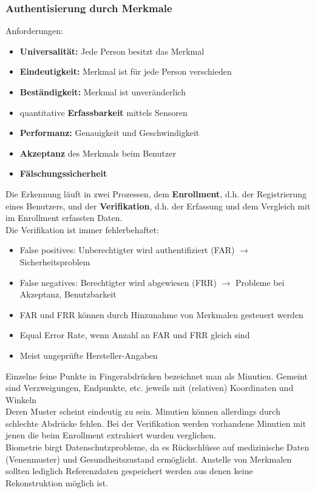 \documentclass[a4paper,12pt,leqno]{article}
\begin{document}
\subsubsection{Authentisierung durch Merkmale}

Anforderungen:
\begin{itemize}
\item \textbf{Universalität:} Jede Person besitzt das Merkmal
\item \textbf{Eindeutigkeit:} Merkmal ist für jede Person verschieden
\item \textbf{Beständigkeit:} Merkmal ist unveränderlich
\item quantitative \textbf{Erfassbarkeit} mittels Sensoren
\item \textbf{Performanz:} Genauigkeit und Geschwindigkeit
\item \textbf{Akzeptanz} des Merkmals beim Benutzer
\item \textbf{Fälschungssicherheit}
\end{itemize}

Die Erkennung läuft in zwei Prozessen, dem \textbf{Enrollment}, d.h. der Registrierung eines Benutzers, und der \textbf{Verifikation}, d.h. der Erfassung und dem Vergleich mit im Enrollment erfassten Daten.\\

Die Verifikation ist immer fehlerbehaftet:
\begin{itemize}
\item False positives: Unberechtigter wird authentifiziert (FAR) $\rightarrow$ Sicherheitsproblem
\item False negatives: Berechtigter wird abgewiesen (FRR) $\rightarrow$ Probleme bei Akzeptanz, Benutzbarkeit
\item FAR und FRR können durch Hinzunahme von Merkmalen gesteuert werden
\item Equal Error Rate, wenn Anzahl an FAR und FRR gleich sind
\item Meist ungeprüfte Hersteller-Angaben
\end{itemize}

Einzelne feine Punkte in Fingerabdrücken bezeichnet man als Minutien. Gemeint sind Verzweigungen, Endpunkte, etc. jeweils mit (relativen) Koordinaten und Winkeln\\
Deren Muster scheint eindeutig zu sein. Minutien können allerdings durch schlechte Abdrücke fehlen. Bei der Verifikation werden vorhandene Minutien mit jenen die beim Enrollment extrahiert wurden verglichen.\\
Biometrie birgt Datenschutzprobleme, da es Rückschlüsse auf medizinische Daten (Venenmuster) und Gesundheitszustand ermöglicht. Anstelle von Merkmalen sollten lediglich Referenzdaten gespeichert werden aus denen keine Rekonstruktion möglich ist.\\
\end{document}
